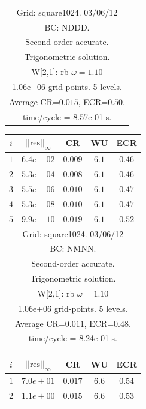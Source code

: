 \begin{table}[hbt]
\begin{center}
{\begin{tabular}{|c|c|c|c|c|}
\hline 
\multicolumn{5}{|c|}{Grid: square1024. 03/06/12}  \\
\multicolumn{5}{|c|}{BC: NDDD.}  \\
\multicolumn{5}{|c|}{Second-order accurate.}  \\
\multicolumn{5}{|c|}{Trigonometric solution.}  \\
\multicolumn{5}{|c|}{W[2,1]: rb $\omega=1.10$}  \\
\multicolumn{5}{|c|}{1.06e+06 grid-points. 5 levels.}  \\
\multicolumn{5}{|c|}{Average CR=$0.015$, ECR=$0.50$.}  \\
\multicolumn{5}{|c|}{time/cycle = 8.57e-01 s.}  \\
\hline 
\end{tabular}
\begin{tabular}{|c|c|c|c|c|} \hline 
 $i$   & $\vert\vert\mbox{res}\vert\vert_\infty$  &  CR     &  WU    & ECR  \\   \hline 
 $ 1$  & $ 6.4e-02$ & $0.009$ & $ 6.1$ & $0.46$ \\ 
 $ 2$  & $ 5.3e-04$ & $0.008$ & $ 6.1$ & $0.46$ \\ 
 $ 3$  & $ 5.5e-06$ & $0.010$ & $ 6.1$ & $0.47$ \\ 
 $ 4$  & $ 5.3e-08$ & $0.010$ & $ 6.1$ & $0.47$ \\ 
 $ 5$  & $ 9.9e-10$ & $0.019$ & $ 6.1$ & $0.52$ \\ 
\hline 
\multicolumn{5}{|c|}{Grid: square1024. 03/06/12}  \\
\multicolumn{5}{|c|}{BC: NMNN.}  \\
\multicolumn{5}{|c|}{Second-order accurate.}  \\
\multicolumn{5}{|c|}{Trigonometric solution.}  \\
\multicolumn{5}{|c|}{W[2,1]: rb $\omega=1.10$}  \\
\multicolumn{5}{|c|}{1.06e+06 grid-points. 5 levels.}  \\
\multicolumn{5}{|c|}{Average CR=$0.011$, ECR=$0.48$.}  \\
\multicolumn{5}{|c|}{time/cycle = 8.24e-01 s.}  \\
\hline 
\end{tabular}
\begin{tabular}{|c|c|c|c|c|} \hline 
 $i$   & $\vert\vert\mbox{res}\vert\vert_\infty$  &  CR     &  WU    & ECR  \\   \hline 
 $ 1$  & $ 7.0e+01$ & $0.017$ & $ 6.6$ & $0.54$ \\ 
 $ 2$  & $ 1.1e+00$ & $0.015$ & $ 6.6$ & $0.53$ \\ 

\end{tabular}}
\end{center}
\end{table}
